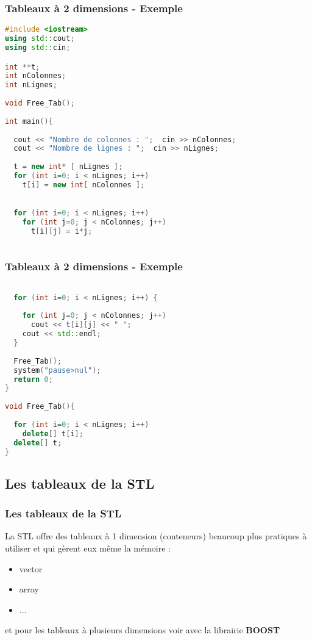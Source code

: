 \documentclass{beamer}
\begin{document}
\begin{frame}[fragile=singleslide,shrink=20]
\frametitle{Tableaux à 2 dimensions - Exemple}
\begin{lstlisting}[language=c++]
#include <iostream>
using std::cout;
using std::cin;

int **t;
int nColonnes;
int nLignes;
 
void Free_Tab(); 
 
int main(){
 
  cout << "Nombre de colonnes : ";  cin >> nColonnes;
  cout << "Nombre de lignes : ";  cin >> nLignes;
 
  t = new int* [ nLignes ];
  for (int i=0; i < nLignes; i++)
    t[i] = new int[ nColonnes ];
 

  for (int i=0; i < nLignes; i++)
    for (int j=0; j < nColonnes; j++)
      t[i][j] = i*j;
 
\end{lstlisting}


\end{frame}

\begin{frame}[fragile=singleslide,shrink=20]
\frametitle{Tableaux à 2 dimensions - Exemple}
\begin{lstlisting}[language=c++]

  for (int i=0; i < nLignes; i++) {
 
    for (int j=0; j < nColonnes; j++)
      cout << t[i][j] << " ";
    cout << std::endl;
  }
 
  Free_Tab();
  system("pause>nul");
  return 0;
}
 
void Free_Tab(){
 
  for (int i=0; i < nLignes; i++)
    delete[] t[i];
  delete[] t;
}
\end{lstlisting}

\end{frame}


\subsection{Les tableaux de la STL}

\begin{frame}[fragile=singleslide,shrink=20]
\frametitle{Les tableaux de la STL}

La STL offre des tableaux à 1 dimension (conteneurs) beaucoup plus pratiques à utiliser et qui gèrent eux même la mémoire :  

\begin{itemize}
\item{vector}
\item{array}
\item{...}
\end{itemize}

et pour les tableaux à plusieurs dimensions voir avec la librairie \textbf{BOOST}

\end{frame}
\end{document}
